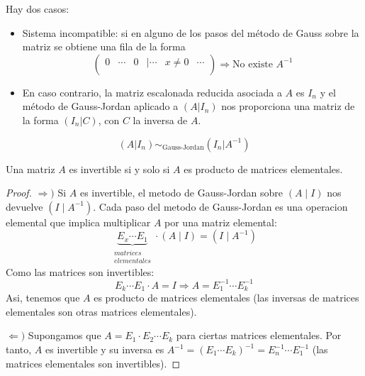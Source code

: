 Hay dos casos:
\begin{itemize}
	\item Sistema incompatible: si en alguno de los pasos del método de Gauss sobre la matriz se obtiene una fila de la forma
	      \[
		      \begin{pmatrix}
			      0 & \cdots & 0 & | \cdots & x \neq  0 & \cdots \\
		      \end{pmatrix} \Rightarrow \text{No existe } A^{-1}
	      \]
	\item En caso contrario, la matriz escalonada reducida asociada a \(A \) es \(I_n \) y el método de Gauss-Jordan aplicado a \((A|I_n )\) nos proporciona una matriz de la forma \((I_n | C )\), con \(C \) la inversa de \(A \).
\end{itemize}
\[
	(A | I_n) \sim_{\text{Gauss-Jordan}}(I_n | A^{-1} )
\]

\begin{proposition}
	Una matriz \(A \) es invertible si y solo si \(A \) es producto de matrices elementales.
\end{proposition}
\begin{proof}
	\(\Rightarrow ) \) Si \(A \) es invertible, el metodo de Gauss-Jordan sobre \((A \mid I )\) nos devuelve \((I \mid A^{-1} )\). Cada paso del metodo de Gauss-Jordan es una operacion elemental que implica multiplicar \(A \) por una matriz elemental: \[\underbrace{E_x \cdots E_1}_{\substack{matrices\\ elementales}} \cdot (A \mid I ) = (I \mid A^{-1})\]
	Como las matrices son invertibles:
	\[
		E_k \cdots E_1 \cdot A = I \Rightarrow A = E^{-1}_1 \cdots E^{-1}_k
	\]
	Asi, tenemos que \(A \) es producto de matrices elementales (las inversas de matrices elementales son otras matrices elementales).

	\(\Leftarrow ) \) Supongamos que \(A = E_1 \cdot E_2 \cdots E_k\) para ciertas matrices elementales. Por tanto, \(A \) es invertible y su inversa es \(A^{-1} = (E_1 \cdots E_k )^{-1} = E^{-1}_n \cdots E^{-1}_1\) (las matrices elementales son invertibles).
\end{proof}

